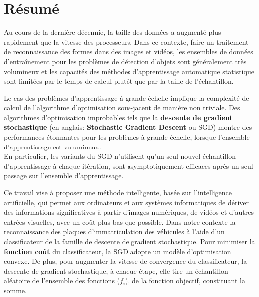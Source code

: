 
\renewcommand{\abstractname}{Résumé} %

\begingroup
\let\clearpage\relax
\let\cleardoublepage\relax
\let\cleardoublepage\relax

\chapter*{Résumé}
	Au cours de la dernière décennie, la taille des données a augmenté plus rapidement que la vitesse des processeurs. Dans ce contexte, faire un traitement de {reconnaissance} des formes dans des images et vidéos, les ensembles de données d'entraînement pour les problèmes de détection d'objets sont généralement très volumineux et les capacités des méthodes d'apprentissage automatique statistique sont limitées par le temps de calcul plutôt que par la taille de l'échantillon. 
	
	Le cas des problèmes d'apprentissage à grande échelle implique la complexité de calcul de l'algorithme d'optimisation sous-jacent de manière non triviale. Des algorithmes d'optimisation improbables tels que la \textbf{descente de gradient stochastique} (en anglais: \textbf{Stochastic Gradient Descent} ou SGD) montre des performances étonnantes pour les problèmes à grande échelle, lorsque l'ensemble d'apprentissage est volumineux. \\
	En particulier, les variants du SGD n'utilisent qu'un seul nouvel échantillon d'apprentissage à chaque itération, sont asymptotiquement efficaces après un seul passage sur l'ensemble d'apprentissage.	
	
	Ce travail vise à proposer une méthode  intelligente, basée sur l'intelligence artificielle, qui permet aux ordinateurs et aux systèmes informatiques de dériver des informations significatives à partir d'images numériques, de vidéos et d'autres entrées visuelles, avec un coût plus bas que possible. Dans notre contexte la reconnaissance des plaques d’immatriculation des véhicules à l'aide d’un classificateur de la famille de descente de gradient stochastique. Pour minimiser la \textbf{fonction coût} du classificateur, la SGD adopte un modèle d'optimisation convexe. De plus, pour augmenter la vitesse de convergence du classificateur, la descente de gradient stochastique, à chaque étape, elle tire un échantillon aléatoire de l'ensemble des fonctions ($f_i$), de la fonction objectif, constituant la somme.
	 
